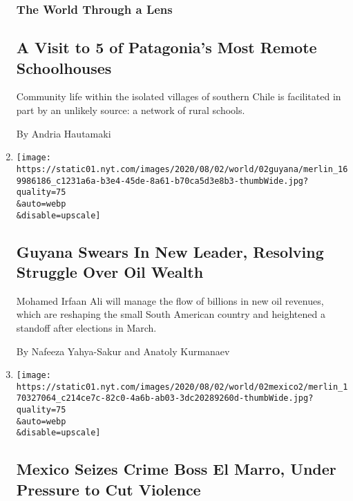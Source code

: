 \begin{enumerate}
  \hypertarget{the-world-through-a-lens}{%
  \subsubsection{The World Through a
  Lens}\label{the-world-through-a-lens}}

  \hypertarget{a-visit-to-5-of-patagonias-most-remote-schoolhouses}{%
  \subsection{A Visit to 5 of Patagonia's Most Remote
  Schoolhouses}\label{a-visit-to-5-of-patagonias-most-remote-schoolhouses}}

  Community life within the isolated villages of southern Chile is
  facilitated in part by an unlikely source: a network of rural schools.

  By Andria Hautamaki
\item
  \href{/2020/08/02/world/americas/guyana-president-ali-oil.html}{}

  \texttt{[image: https://static01.nyt.com/images/2020/08/02/world/02guyana/merlin\_169986186\_c1231a6a-b3e4-45de-8a61-b70ca5d3e8b3-thumbWide.jpg?quality=75\\\&auto=webp\\\&disable=upscale]}

  \hypertarget{guyana-swears-in-new-leader-resolving-struggle-over-oil-wealth}{%
  \subsection{Guyana Swears In New Leader, Resolving Struggle Over Oil
  Wealth}\label{guyana-swears-in-new-leader-resolving-struggle-over-oil-wealth}}

  Mohamed Irfaan Ali will manage the flow of billions in new oil
  revenues, which are reshaping the small South American country and
  heightened a standoff after elections in March.

  By Nafeeza Yahya-Sakur and Anatoly Kurmanaev
\item
  \href{/2020/08/02/world/americas/mexico-el-marro-capture.html}{}

  \texttt{[image: https://static01.nyt.com/images/2020/08/02/world/02mexico2/merlin\_170327064\_c214ce7c-82c0-4a6b-ab03-3dc20289260d-thumbWide.jpg?quality=75\\\&auto=webp\\\&disable=upscale]}

  \hypertarget{mexico-seizes-crime-boss-el-marro-under-pressure-to-cut-violence}{%
  \subsection{Mexico Seizes Crime Boss El Marro, Under Pressure to Cut
  Violence}\label{mexico-seizes-crime-boss-el-marro-under-pressure-to-cut-violence}}


\end{enumerate}
